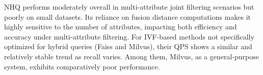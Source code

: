 \documentclass[sigconf, nonacm]{acmart}
\begin{document}
{	NHQ performs moderately overall in multi-attribute joint filtering scenarios but poorly on small datasets. Its reliance on fusion distance computations makes it highly sensitive to the number of attributes, impacting both efficiency and accuracy under multi-attribute filtering.
	For IVF-based methods not specifically optimized for hybrid queries (Faiss and Milvus), their QPS shows a similar and relatively stable trend as recall varies. Among them, Milvus, as a general-purpose system, exhibits comparatively poor performance.
	
%	
%	
%
%	
	
}
\end{document}
